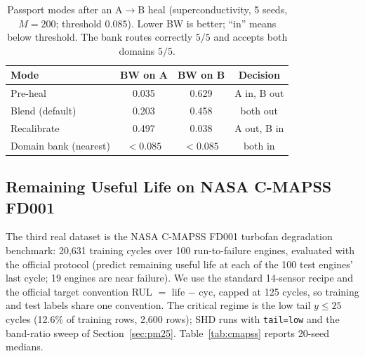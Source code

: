 \documentclass[11pt,a4paper]{article}
\begin{document}
\begin{table}[t]
\centering
\small
\caption{Passport modes after an A$\to$B heal (superconductivity, 5 seeds, $M=200$; threshold $0.085$). Lower BW is better; ``in'' means below threshold. The bank routes correctly $5/5$ and accepts both domains $5/5$.}
\label{tab:passport}
\begin{tabular}{lccc}
\toprule
\textbf{Mode} & \textbf{BW on A} & \textbf{BW on B} & \textbf{Decision} \\
\midrule
Pre-heal & 0.035 & 0.629 & A in, B out \\
Blend (default) & 0.203 & 0.458 & both out \\
Recalibrate & 0.497 & 0.038 & A out, B in \\
Domain bank (nearest) & $<0.085$ & $<0.085$ & both in \\
\bottomrule
\end{tabular}
\end{table}

\subsection{Remaining Useful Life on NASA C-MAPSS FD001}
\label{sec:cmapss}
The third real dataset is the NASA C-MAPSS FD001 turbofan degradation benchmark: 20,631 training cycles over 100 run-to-failure engines, evaluated with the official protocol (predict remaining useful life at each of the 100 test engines' last cycle; 19 engines are near failure). We use the standard 14-sensor recipe and the official target convention RUL $=$ life $-$ cyc, capped at 125 cycles, so training and test labels share one convention. The critical regime is the low tail $y \le 25$ cycles (12.6\% of training rows, 2,600 rows); SHD runs with \texttt{tail=low} and the band-ratio sweep of Section~\ref{sec:pm25}. Table~\ref{tab:cmapss} reports 20-seed medians.
\end{document}
